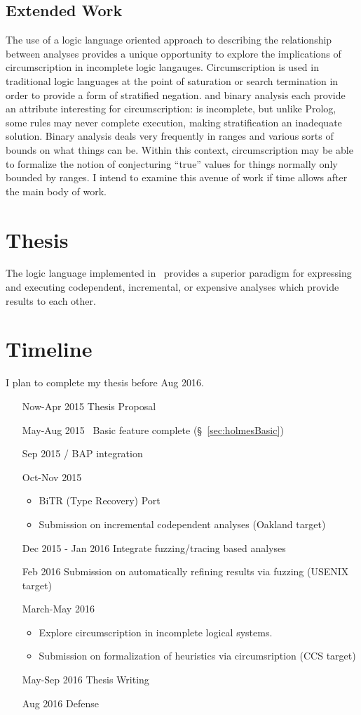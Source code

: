 \subsection{Extended Work}
The use of a logic language oriented approach to describing the relationship between analyses provides a unique opportunity to explore the implications of circumscription in incomplete logic langauges.
Circumscription is used in traditional logic languages at the point of saturation or search termination in order to provide a form of stratified negation.
\sysname and binary analysis each provide an attribute interesting for circumscription:
\sysname is incomplete, but unlike Prolog, some rules may never complete execution, making stratification an inadequate solution.
Binary analysis deals very frequently in ranges and various sorts of bounds on what things can be.
Within this context, circumscription may be able to formalize the notion of conjecturing ``true'' values for things normally only bounded by ranges.
I intend to examine this avenue of work if time allows after the main body of work.
\section{Thesis}
The logic language implemented in \sysname\ provides a superior paradigm for expressing and executing codependent, incremental, or expensive analyses which provide results to each other.
\section{Timeline}
I plan to complete my thesis before Aug 2016.
\begin{enumerate}
\item[Now-Apr 2015] Thesis Proposal
\item[May-Aug 2015] \sysname\ Basic feature complete (\S~\ref{sec:holmesBasic})
\item[Sep 2015] \sysname / BAP integration
\item[Oct-Nov 2015]
  \begin{itemize}
  \item BiTR (Type Recovery) Port
  \item Submission on incremental codependent analyses (Oakland target)
  \end{itemize}
\item[Dec 2015 - Jan 2016] Integrate fuzzing/tracing based analyses
\item[Feb 2016] Submission on automatically refining results via fuzzing (USENIX target)
\item[March-May 2016]
  \begin{itemize}
  \item Explore circumscription in incomplete logical systems.
  \item Submission on formalization of heuristics via circumsription (CCS target)
  \end{itemize}
\item[May-Sep 2016] Thesis Writing
\item[Aug 2016] Defense
\end{enumerate}

